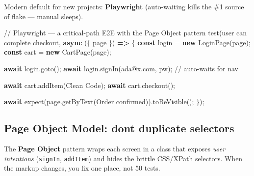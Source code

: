 \documentclass[11pt]{article}
\newenvironment{Shaded}{\begin{snugshade}}{\end{snugshade}}
\newcommand{\CommentTok}[1]{\textcolor[rgb]{0.48,0.49,0.49}{#1}}
\newcommand{\ControlFlowTok}[1]{\textcolor[rgb]{0.99,0.74,0.29}{\textbf{#1}}}
\newcommand{\FunctionTok}[1]{\textcolor[rgb]{0.56,0.27,0.68}{#1}}
\newcommand{\KeywordTok}[1]{\textcolor[rgb]{0.81,0.81,0.76}{\textbf{#1}}}
\newcommand{\NormalTok}[1]{\textcolor[rgb]{0.81,0.81,0.76}{#1}}
\newcommand{\OperatorTok}[1]{\textcolor[rgb]{0.81,0.81,0.76}{#1}}
\newcommand{\StringTok}[1]{\textcolor[rgb]{0.96,0.31,0.31}{#1}}
\begin{document}
Modern default for new projects: \textbf{Playwright} (auto-waiting kills the \#1 source of flake --- manual sleeps).


\begin{Shaded}
\begin{Highlighting}[]
\CommentTok{// Playwright — a critical{-}path E2E with the Page Object pattern}
\FunctionTok{test}\NormalTok{(}\StringTok{\textquotesingle{}user can complete checkout\textquotesingle{}}\OperatorTok{,} \KeywordTok{async}\NormalTok{ (\{ page \}) }\KeywordTok{=\textgreater{}}\NormalTok{ \{}
  \KeywordTok{const}\NormalTok{ login }\OperatorTok{=} \KeywordTok{new} \FunctionTok{LoginPage}\NormalTok{(page)}\OperatorTok{;}
  \KeywordTok{const}\NormalTok{ cart  }\OperatorTok{=} \KeywordTok{new} \FunctionTok{CartPage}\NormalTok{(page)}\OperatorTok{;}

  \ControlFlowTok{await}\NormalTok{ login}\OperatorTok{.}\FunctionTok{goto}\NormalTok{()}\OperatorTok{;}
  \ControlFlowTok{await}\NormalTok{ login}\OperatorTok{.}\FunctionTok{signIn}\NormalTok{(}\StringTok{\textquotesingle{}ada@x.com\textquotesingle{}}\OperatorTok{,} \StringTok{\textquotesingle{}pw\textquotesingle{}}\NormalTok{)}\OperatorTok{;}     \CommentTok{// auto{-}waits for nav}

  \ControlFlowTok{await}\NormalTok{ cart}\OperatorTok{.}\FunctionTok{addItem}\NormalTok{(}\StringTok{\textquotesingle{}Clean Code\textquotesingle{}}\NormalTok{)}\OperatorTok{;}
  \ControlFlowTok{await}\NormalTok{ cart}\OperatorTok{.}\FunctionTok{checkout}\NormalTok{()}\OperatorTok{;}

  \ControlFlowTok{await} \FunctionTok{expect}\NormalTok{(page}\OperatorTok{.}\FunctionTok{getByText}\NormalTok{(}\StringTok{\textquotesingle{}Order confirmed\textquotesingle{}}\NormalTok{))}\OperatorTok{.}\FunctionTok{toBeVisible}\NormalTok{()}\OperatorTok{;}
\NormalTok{\})}\OperatorTok{;}
\end{Highlighting}
\end{Shaded}

\subsection{Page Object Model: don\textquotesingle t duplicate selectors}\label{page-object-model-dont-duplicate-selectors}

The \textbf{Page Object} pattern wraps each screen in a class that exposes \emph{user intentions} (\texttt{signIn}, \texttt{addItem}) and hides the brittle CSS/XPath selectors. When the markup changes, you fix one place, not 50 tests.
\end{document}
